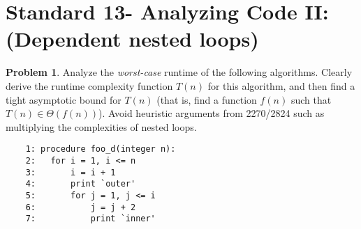 \documentclass[11pt]{article}
\theoremstyle{definition}
\theoremstyle{definition}
\newtheorem{required}{Problem}
\theoremstyle{definition}
\begin{document}
\newpage
\section{Standard 13- Analyzing Code II: (Dependent nested loops)}
\begin{required}


Analyze the \textit{worst-case} runtime of the following algorithms. Clearly derive the runtime complexity function $T(n)$ for this algorithm, and then find a tight asymptotic bound for $T(n)$ (that is, find a function $f(n)$ such that $T(n) \in \Theta(f(n))$). Avoid heuristic arguments from 2270/2824 such as multiplying the complexities of nested loops.

\begin{verbatim}
	1: procedure foo_d(integer n):
	2:   for i = 1, i <= n
	3:       i = i + 1
	4:       print `outer'
	5:       for j = 1, j <= i
	6:           j = j + 2
	7:           print `inner'
\end{verbatim}




\end{required}
\end{document}

